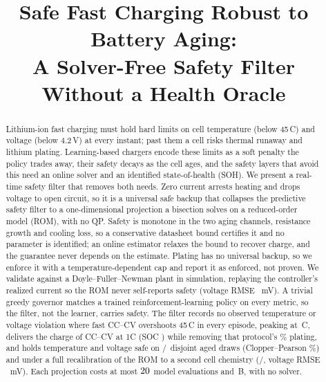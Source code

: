 \documentclass[conference]{IEEEtran}
\newcommand{\SI}[2]{#1\,#2}
\newcommand{\degreeCelsius}{\textdegree C}
\begin{document}
\title{Safe Fast Charging Robust to Battery Aging:\\
A Solver-Free Safety Filter Without a Health Oracle}

\author{
}

\maketitle

\begin{abstract}
Lithium-ion fast charging must hold hard limits on cell temperature (below \SI{45}{\degreeCelsius})
and voltage (below \SI{4.2}{V}) at every instant; past them a cell risks thermal runaway and lithium
plating. Learning-based chargers encode these limits as a soft penalty the policy trades away, their
safety decays as the cell ages, and the safety layers that avoid this need an online solver and an
identified state-of-health (SOH). We present a real-time safety filter that removes both needs. Zero
current arrests heating and drops voltage to open circuit, so it is a universal safe backup that
collapses the predictive safety filter to a one-dimensional projection a bisection solves on a
reduced-order model (ROM), with no QP. Safety is monotone in the two aging channels, resistance growth
and cooling loss, so a conservative datasheet bound certifies it and no parameter is identified; an
online estimator relaxes the bound to recover charge, and the guarantee never depends on the estimate.
Plating has no universal backup, so we enforce it with a temperature-dependent cap and report it as
enforced, not proven. We validate against a Doyle--Fuller--Newman plant in simulation, replaying the
controller's realized current so the ROM never self-reports safety (voltage RMSE \VRMSE~mV). A trivial
greedy governor matches a trained reinforcement-learning policy on every metric, so the filter, not
the learner, carries safety. The filter records no observed temperature or voltage violation where
fast CC--CV overshoots \SI{45}{\degreeCelsius} in every episode, peaking at
\SI{\dfnOursWarmT}{\degreeCelsius}, delivers the charge of CC--CV at 1C (SOC \oursWarmSoc)
while removing that protocol's \cconeWarmPviol\% plating, and holds temperature and voltage safe on
\valSafe/\valN\ disjoint aged draws (Clopper--Pearson \valCP\%) and under a full recalibration of the
ROM to a second cell chemistry (\chemTwoSafe/\chemTwoN, voltage RMSE \chemTwoV~mV). Each projection
costs at most $20$ model evaluations and \SI{\filterMemB}{B}, with no solver.
\end{abstract}
\end{document}
